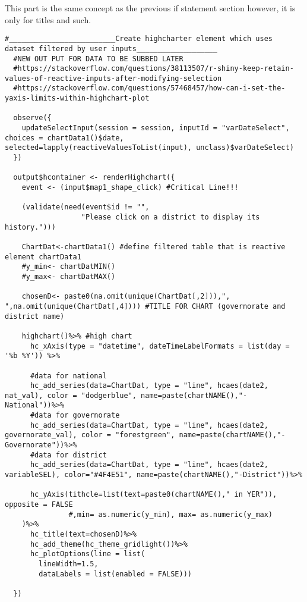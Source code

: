 \documentclass[
]{article}
\begin{document}
This part is the same concept as the previous if statement section
however, it is only for titles and such.

\begin{verbatim}
#_________________________Create highcharter element which uses dataset filtered by user inputs___________________
  #NEW OUT PUT FOR DATA TO BE SUBBED LATER
  #https://stackoverflow.com/questions/38113507/r-shiny-keep-retain-values-of-reactive-inputs-after-modifying-selection
  #https://stackoverflow.com/questions/57468457/how-can-i-set-the-yaxis-limits-within-highchart-plot
  
  observe({
    updateSelectInput(session = session, inputId = "varDateSelect", choices = chartData1()$date, selected=lapply(reactiveValuesToList(input), unclass)$varDateSelect)
  })
  
  output$hcontainer <- renderHighchart({
    event <- (input$map1_shape_click) #Critical Line!!!
    
    (validate(need(event$id != "",
                  "Please click on a district to display its history.")))

    ChartDat<-chartData1() #define filtered table that is reactive element chartData1
    #y_min<- chartDatMIN()
    #y_max<- chartDatMAX()
    
    chosenD<- paste0(na.omit(unique(ChartDat[,2])),", ",na.omit(unique(ChartDat[,4]))) #TITLE FOR CHART (governorate and district name)
  
    highchart()%>% #high chart
      hc_xAxis(type = "datetime", dateTimeLabelFormats = list(day = '%b %Y')) %>%
        
      #data for national
      hc_add_series(data=ChartDat, type = "line", hcaes(date2, nat_val), color = "dodgerblue", name=paste(chartNAME(),"-National"))%>%
      #data for governorate
      hc_add_series(data=ChartDat, type = "line", hcaes(date2, governorate_val), color = "forestgreen", name=paste(chartNAME(),"-Governorate"))%>%
      #data for district
      hc_add_series(data=ChartDat, type = "line", hcaes(date2, variableSEL), color="#4F4E51", name=paste(chartNAME(),"-District"))%>%
      
      hc_yAxis(tithcle=list(text=paste0(chartNAME()," in YER")), opposite = FALSE
               #,min= as.numeric(y_min), max= as.numeric(y_max)
    )%>%
      hc_title(text=chosenD)%>%
      hc_add_theme(hc_theme_gridlight())%>%
      hc_plotOptions(line = list(
        lineWidth=1.5,
        dataLabels = list(enabled = FALSE)))
    
  })
\end{verbatim}
\end{document}
